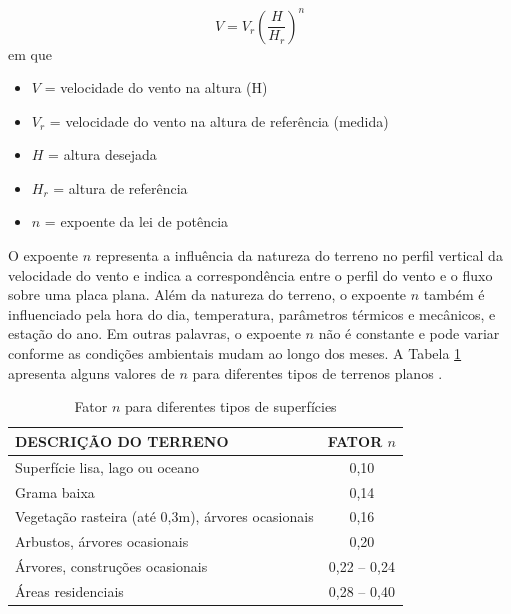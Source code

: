        \begin{equation}
            V = V_r \left( \frac{H}{H_r} \right)^n
            \label{eq:lei da potência}
        \end{equation}
      em que 
        \begin{itemize}
            \item $V$ = velocidade do vento na altura (H)
            \item $V_r$ = velocidade do vento na altura de referência (medida)
            \item $H$ = altura desejada
            \item $H_r$ = altura de referência
            \item $n$ = expoente da lei de potência
        \end{itemize}

        \par O expoente $n$ representa a influência da natureza do terreno no perfil vertical da velocidade do vento e indica a correspondência entre o perfil do vento e o fluxo sobre uma placa plana. Além da natureza do terreno, o expoente $n$ também é influenciado pela hora do dia, temperatura, parâmetros térmicos e mecânicos, e estação do ano. Em outras palavras, o expoente $n$ não é constante e pode variar conforme as condições ambientais mudam ao longo dos meses. A Tabela \ref{tab:valores de n para tipos de superficie} apresenta alguns valores de $n$ para diferentes tipos de terrenos planos \cite{fadigas2011}.

        \begin{table}[h!]
            \centering
            \caption{Fator $n$ para diferentes tipos de superfícies}
            \label{tab:valores de n para tipos de superficie}
            \begin{tabular}{l|c}
                \hline
                \textbf{DESCRIÇÃO DO TERRENO} & \textbf{FATOR $n$} \\ \hline
                Superfície lisa, lago ou oceano & 0,10 \\ \hline
                Grama baixa & 0,14 \\ \hline
                Vegetação rasteira (até 0,3m), árvores ocasionais & 0,16 \\ \hline
                Arbustos, árvores ocasionais & 0,20 \\ \hline
                Árvores, construções ocasionais & 0,22 -- 0,24 \\ \hline
                Áreas residenciais & 0,28 -- 0,40 \\ \hline
            \end{tabular}
        \end{table}

